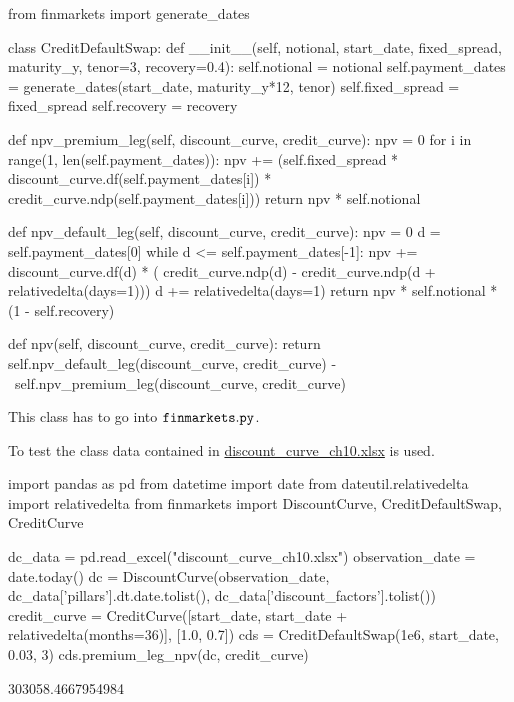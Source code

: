 \begin{ipython}
from finmarkets import generate_dates

class CreditDefaultSwap:
    def __init__(self, notional, start_date, fixed_spread,
                 maturity_y, tenor=3, recovery=0.4):
        self.notional = notional
        self.payment_dates = generate_dates(start_date,
                                            maturity_y*12, tenor)
        self.fixed_spread = fixed_spread
        self.recovery = recovery

    def npv_premium_leg(self, discount_curve, credit_curve):
        npv = 0
        for i in range(1, len(self.payment_dates)):
            npv += (self.fixed_spread *
                    discount_curve.df(self.payment_dates[i]) *
                    credit_curve.ndp(self.payment_dates[i]))
        return npv * self.notional

    def npv_default_leg(self, discount_curve, credit_curve):
        npv = 0
        d = self.payment_dates[0]
        while d <= self.payment_dates[-1]:
            npv += discount_curve.df(d) * (
                   credit_curve.ndp(d) -
                   credit_curve.ndp(d + relativedelta(days=1)))
            d += relativedelta(days=1)
        return npv * self.notional * (1 - self.recovery)

    def npv(self, discount_curve, credit_curve):
        return self.npv_default_leg(discount_curve, credit_curve) - \
               self.npv_premium_leg(discount_curve, credit_curve)
\end{ipython}
\begin{finmarkets}
This class has to go into $\tt{finmarkets.py}$.
\end{finmarkets}

To test the class data contained in \href{https://github.com/matteosan1/finance_course/raw/develop/libro/input_files/discount_curve_ch_10.xlsx}{discount\_curve\_ch10.xlsx} is used.

\begin{ipython}
import pandas as pd
from datetime import date
from dateutil.relativedelta import relativedelta
from finmarkets import DiscountCurve, CreditDefaultSwap, CreditCurve

dc_data = pd.read_excel("discount_curve_ch10.xlsx")
observation_date = date.today() 
dc = DiscountCurve(observation_date,
dc_data['pillars'].dt.date.tolist(),
dc_data['discount_factors'].tolist())
credit_curve = CreditCurve([start_date,
                            start_date + relativedelta(months=36)],
                            [1.0, 0.7])
cds = CreditDefaultSwap(1e6, start_date, 0.03, 3)
cds.premium_leg_npv(dc, credit_curve)
\end{ipython}
\begin{ioutput}
303058.4667954984
\end{ioutput}

